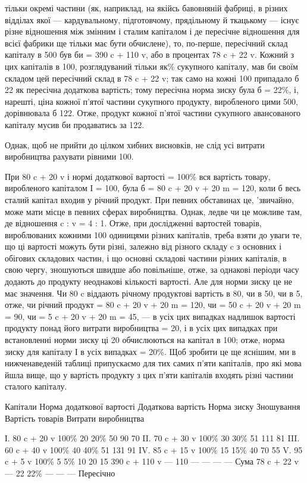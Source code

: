 \parcont{}  %
тільки окремі частини (як, наприклад, на якійсь бавовняній фабриці, в різних відділах якої —
кардувальному, підготовчому, прядільному й ткацькому — існує різне відношення між змінним і
сталим капіталом і де пересічне відношення для всієї фабрики
ще тільки має бути обчислене), то, по-перше, пересічний склад
капіталу в 500 був би = 390 c + 110 v, або в процентах 78 c + 22 v.
Кожний з цих капіталів в 100, розглядуваний тільки як\% сукупного капіталу, мав би своїм складом цей
пересічний склад
в 78 c + 22 v; так само на кожні 100 припадало б 22 як пересічна
додаткова вартість; тому пересічна норма зиску була б = 22\%,
і, нарешті, ціна кожної п’ятої частини сукупного продукту, виробленого цими 500, дорівнювала б 122.
Отже, продукт кожної
п’ятої частини сукупного авансованого капіталу мусив би продаватись за 122.

Однак, щоб не прийти до цілком хибних висновків, не слід
усі витрати виробництва рахувати рівними 100.

При 80 c + 20 v і нормі додаткової вартості = 100\% вся вартість товару, виробленого капіталом І =
100, була б = 80 c + 20 v + 20 m = 120, коли б весь сталий капітал входив у річний продукт. При
певних обставинах це, 'звичайно, може мати місце
в певних сферах виробництва. Однак, ледве чи це можливе там,
де відношення c : v = 4 : 1. Отже, при дослідженні вартостей товарів, вироблюваних кожними 100
одиницями різних капіталів,
треба взяти до уваги те, що ці вартості можуть бути різні, залежно від різного складу c з основних і
обігових складових
частин, і що основні складові частини різних капіталів, в свою
чергу, зношуються швидше або повільніше, отже, за однакові
періоди часу додають до продукту неоднакові кількості вартості. Але для норми зиску це не має
значення. Чи 80 c віддають
річному продуктові вартість в 80, чи в 50, чи в 5, отже, чи річний
продукт = 80 c + 20 v + 20 m = 120, чи = 50 c + 20 v + 20 m = 90, чи = 5 c + 20 v + 20 m = 45, — в
усіх цих випадках надлишок
вартості продукту понад його витрати виробництва = 20, і в усіх
цих випадках при встановленні норми зиску ці 20 обчислюються
на капітал в 100; отже, норма зиску для капіталу І в усіх випадках = 20\%. Щоб зробити це ще яснішим,
ми в нижченаведеній
таблиці припускаємо для тих самих п’яти капіталів, про які мова
йшла вище, що у вартість продукту з цих п’яти капіталів входять різні частини сталого капіталу.

Капітали
Норма додаткової вартості
Додаткова вартість
Норма зиску
Зношування
Вартість товарів
Витрати виробництва

І.    80 c + 20 v    100\%    20    20\%    50    90    70
II.   70 c + 30 v    100\%    30    30\%    51    111    81
III.   60 c + 40 v   100\%    40    40\%    51    131    91
IV.    85 c + 15 v  100\%    15    15\%    40    70    55
V.    95 c + 5 v      100\%    5      5\%      10    20    15
    390 c + 110 v      —    110    —        —     —      — Сума
    78 c + 22 v          —     22    22\%     —     —      — Пересічно
